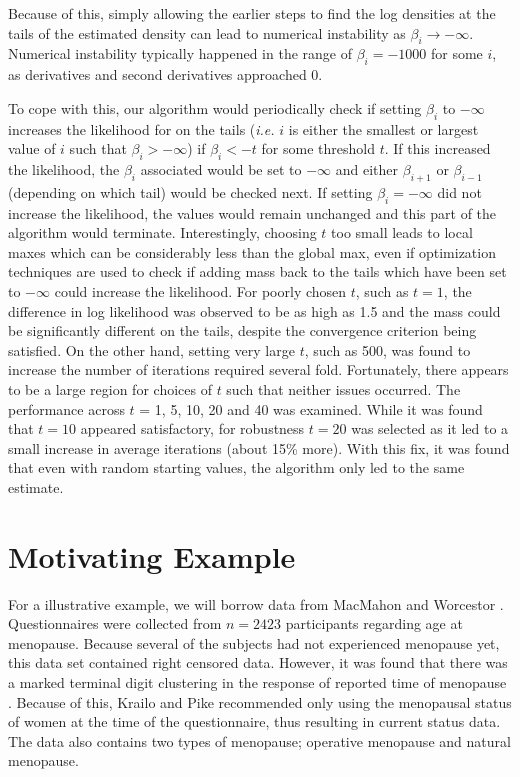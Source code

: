 	Because of this, simply allowing the earlier steps to find the log densities	 at the tails of the estimated density can lead to numerical instability as $\beta_i \rightarrow -\infty$. Numerical instability typically happened in the range of $\beta_i = -1000$ for some $i$, as derivatives and second derivatives approached 0.%
	
	To cope with this, our algorithm would periodically check if setting $\beta_i$ to $-\infty$ increases the likelihood for on the tails (\emph{i.e.} $i$ is either the smallest or largest value of $i$ such that $\beta_i > -\infty$) if $\beta_i < -t$ for some threshold $t$. If this increased the likelihood, the $\beta_i$ associated would be set to $-\infty$ and either $\beta_{i+1}$ or $\beta_{i-1}$ (depending on which tail) would be checked next. If setting $\beta_i = -\infty$ did not increase the likelihood, the values would remain unchanged and this part of the algorithm would terminate. Interestingly, choosing $t$ too small leads to local maxes which can be considerably less than the global max, even if optimization techniques are used to check if adding mass back to the tails which have been set to $-\infty$ could increase the likelihood. For poorly chosen $t$, such as $t = 1$, the difference in log likelihood was observed to be as high as 1.5 and the mass could be significantly different on the tails, despite the convergence criterion being satisfied. On the other hand, setting very large $t$, such as 500, was found to increase the number of iterations required several fold. Fortunately, there appears to be a large region for choices of $t$ such that neither issues occurred. The performance across $t$ = 1, 5, 10, 20 and 40 was examined. While it was found that $t = 10$ appeared satisfactory, for robustness $t = 20$ was selected as it led to a small increase in average iterations (about 15\% more). With this fix, it was found that even with random starting values, the algorithm only led to the same estimate. 


	{\section{Motivating Example} }
	\label{sec:6}
		For a illustrative example, we will borrow data from MacMahon and Worcestor \cite{RefMW1966}. Questionnaires were collected from $n = 2423$ participants regarding age at menopause. Because several of the subjects had not experienced menopause yet, this data set contained right censored data. However, it was found that there was a marked terminal digit clustering in the response of reported time of menopause \cite{RefMW1996}. Because of this, Krailo and Pike \cite{KP1983} recommended only using the menopausal status of women at the time of the questionnaire, thus resulting in current status data. The data also contains two types of menopause; operative menopause and natural menopause. 
	
